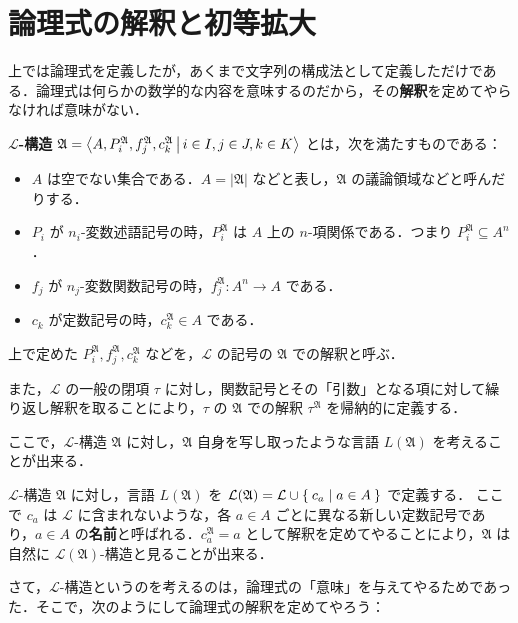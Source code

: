 \documentclass[a4j]{jsarticle}
\begin{document}
\section{論理式の解釈と初等拡大}
上では論理式を定義したが，あくまで文字列の構成法として定義しただけである．論理式は何らかの数学的な内容を意味するのだから，その{\bfseries 解釈}を定めてやらなければ意味がない．

\begin{definition}
 {\bfseries $\mathcal{L}$-構造} $\mathfrak{A} = \Braket{ A, P_i^\mathfrak{A}, f_j^\mathfrak{A}, c_k^\mathfrak{A} | i \in I, j \in J, k \in K }$ とは，次を満たすものである：
 \begin{itemize}
  \item $A$ は空でない集合である．$A = |\mathfrak{A}|$ などと表し，$\mathfrak{A}$ の議論領域などと呼んだりする．
  \item $P_i$ が $n_i$-変数述語記号の時，$P_i^\mathfrak{A}$ は $A$ 上の $n$-項関係である．つまり $P_i^\mathfrak{A} \subseteq A^n$．
  \item $f_j$ が $n_j$-変数関数記号の時，$f_j^\mathfrak{A}: A^n \rightarrow A$ である．
  \item $c_k$ が定数記号の時，$c_k^\mathfrak{A} \in A$ である．
 \end{itemize}
 上で定めた $P_i^\mathfrak{A}, f_j^\mathfrak{A}, c_k^\mathfrak{A}$ などを，$\mathcal{L}$ の記号の $\mathfrak{A}$ での解釈と呼ぶ．

 また，$\mathcal{L}$ の一般の閉項 $\tau$ に対し，関数記号とその「引数」となる項に対して繰り返し解釈を取ることにより，$\tau$ の $\mathfrak{A}$ での解釈 $\tau^\mathfrak{A}$ を帰納的に定義する．
\end{definition}

ここで，$\mathcal{L}$-構造 $\mathfrak{A}$ に対し，$\mathfrak{A}$ 自身を写し取ったような言語 $L(\mathfrak{A})$ を考えることが出来る．

\begin{definition}
 $\mathcal{L}$-構造 $\mathfrak{A}$ に対し，言語 $L(\mathfrak{A})$ を
  $\mathcal{L}(\mathfrak{A}) = \mathcal{L} \cup  \Set{ c_a | a \in A }$ で定義する．
 ここで $c_a$ は $\mathcal{L}$ に含まれないような，各 $a \in A$ ごとに異なる新しい定数記号であり，$a \in A$ の{\bfseries 名前}と呼ばれる．$c_a^\mathfrak{A} = a$ として解釈を定めてやることにより，$\mathfrak{A}$ は自然に $\mathcal{L}(\mathfrak{A})$-構造と見ることが出来る．
\end{definition}

さて，$\mathcal{L}$-構造というのを考えるのは，論理式の「意味」を与えてやるためであった．そこで，次のようにして論理式の解釈を定めてやろう：
\end{document}
